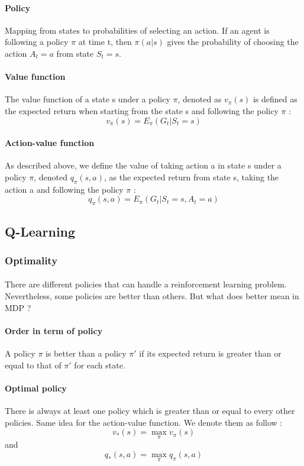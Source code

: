 \documentclass[a4paper]{article}
\begin{document}
\paragraph{Policy } Mapping from states to probabilities of selecting an action. If an agent is following a policy $\pi$ at time t, then $\pi(a|s)$ gives the probability of choosing the action $A_t = a$ from state $S_t = s$.

\paragraph{Value function} The value function of a state s under a policy $\pi$, denoted as $v_{\pi}(s)$ is defined as the expected return when starting from the state s and following the policy $\pi$ :  
\[ 
v_{\pi}(s) = E_{\pi}(G_t | S_t = s) 
\]
\paragraph{Action-value function} As described above, we define the value of taking action a in state s under a policy $\pi$, denoted $q_{\pi}(s,a) $, as the expected return from state s, taking the action a and following the policy $\pi$ : 
\[ q_{\pi}(s,a) = E_{\pi}(G_t | S_t = s, A_t = a) \] 


\subsection{Q-Learning}

\subsubsection{Optimality}

\paragraph{} There are different policies that can handle a reinforcement learning problem. Nevertheless, some policies are better than others. But what does better mean in MDP ? 
\paragraph{Order in term of policy} A policy $\pi$ is better than a policy $\pi'$ if its expected return is greater than or equal to that of $\pi'$ for each state.
\paragraph{Optimal policy} There is always at least one policy which is greater than or equal to every other policies. Same idea for the action-value function. We denote them as follow : 
\[    v_{*}(s) = \max_{\pi} v_{\pi}(s)          \] and 
\[    q_{*}(s,a) = \max_{\pi} q_{\pi}(s,a)          \] 
\end{document}
